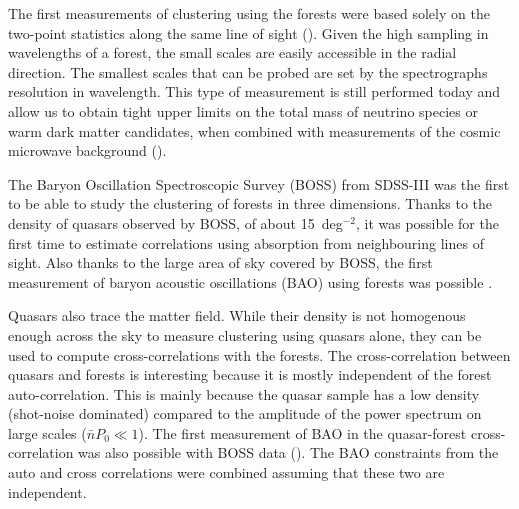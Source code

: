 The first measurements of clustering using the \lya forests 
were based solely on the two-point statistics along the same 
line of sight (\cite{croftPowerSpectrumMass1999, mcdonaldLyAlphaForest2006}). 
Given the high sampling in wavelengths of a forest, the small scales 
are easily accessible in the radial direction. 
The smallest scales that can be probed are set by the spectrographs resolution in wavelength.
This type of measurement is still performed today and allow us to obtain tight upper limits on 
the total mass of neutrino species or warm dark matter candidates, 
when combined with measurements of the cosmic microwave background
(\cite{palanque-delabrouilleHintsNeutrinoBounds2020}). 

The Baryon Oscillation Spectroscopic Survey (BOSS) from SDSS-III 
was the first to be able to study the clustering of \lya forests in three dimensions.
Thanks to the density of quasars observed by BOSS, of about 15~deg$^{-2}$, 
it was possible for the first time to estimate correlations using absorption 
from neighbouring lines of sight. Also thanks to the large area of sky covered by 
BOSS, the first measurement of baryon acoustic oscillations (BAO) using forests was possible 
\cite{buscaBaryonAcousticOscillations2013, 
slosarMeasurementBaryonAcoustic2013, 
kirkbyFittingMethodsBaryon2013}.

Quasars also trace the matter field. While their density is not homogenous enough across the sky 
to measure clustering using quasars alone, they can be used to compute cross-correlations with 
the forests. The cross-correlation between quasars and \lya forests is interesting 
because it is mostly independent of the \lya forest auto-correlation. 
This is mainly because the quasar sample has a low density (shot-noise dominated)
compared to the amplitude of the power spectrum on large scales ($\bar{n}P_0 \ll 1$).
The first measurement of BAO in the quasar-forest cross-correlation was also possible with 
BOSS data (\cite{font-riberaQuasarLymanalphaForestCrosscorrelation2014}). 
The BAO constraints from the auto and cross correlations 
were combined assuming that these two are independent. 

